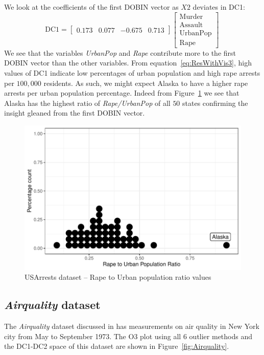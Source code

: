 \documentclass[a4paper,11pt]{article}
\begin{document}
\noindent
We look at the coefficients of the first DOBIN vector as  $X2$ deviates in DC1:
\begin{equation}\label{eq:ResWithVis3}
    \text{DC1} = \begin{bmatrix}
    0.173 & 0.077 &  -0.675 & 0.713   
    \end{bmatrix}
    \begin{bmatrix}
    \text{Murder} \\
    \text{Assault} \\
    \text{UrbanPop} \\
    \text{Rape} 
    \end{bmatrix} \, 
\end{equation}
We see that the variables \textit{UrbanPop} and \textit{Rape} contribute more to the first DOBIN vector than the other variables. From equation~\eqref{eq:ResWithVis3},  high values of DC1 indicate  low percentages of urban population and high rape arrests per $100,000$ residents. As such, we might expect Alaska to have a higher rape arrests per urban population percentage. Indeed from Figure~\ref{fig:USArrests3} we see that Alaska has the highest ratio of  \textit{Rape/UrbanPop} of all $50$ states confirming the insight gleaned from the first DOBIN vector. 

\begin{figure}[!ht]
	\centering
	\includegraphics[scale=0.48]{Ex3_3.pdf}
	\caption{USArrests dataset -- Rape to Urban population ratio values}
	\label{fig:USArrests3}
\end{figure}


\subsection{\textit{Airquality} dataset}\label{sec:ResWithVis4}
The \textit{Airquality} dataset discussed in \cite{john1983graphical} has measurements on air quality in New York city from May to September 1973.  The O3 plot using all $6$ outlier methods and the DC1-DC2 space of this dataset are shown in Figure~\ref{fig:Airquality}.
\end{document}
